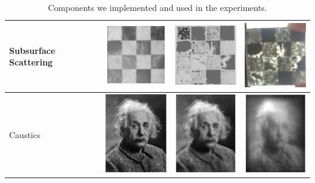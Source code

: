 \documentclass[annual]{acmsiggraph}
\begin{document}
\begin{table}
\begin{tabular}{|p{2cm}|l|l|l|}
\hline
Subsurface Scattering&  \includegraphics[width=3cm]{figure/chessTarget.png}& \includegraphics[width=3cm]{figure/chessSim.png}
& \includegraphics[width=3cm]{figure/chess.png}\\
\hline
Caustics &  \includegraphics[width=3cm]{figure/causticsTarget.png}& \includegraphics[width=3cm]{figure/causticsSim.png}
& \includegraphics[width=3cm]{figure/caustics.png}\\
\hline
\end{tabular}
\caption{Components we implemented and used in the experiments.}
\label{tab:result}
\end{table}
\end{document}
